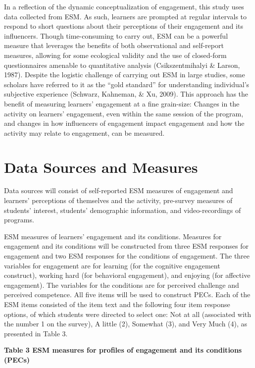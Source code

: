 \documentclass[]{book}
\theoremstyle{definition}
\theoremstyle{definition}
\theoremstyle{definition}
\theoremstyle{remark}
\begin{document}
In a reflection of the dynamic conceptualization of engagement, this
study uses data collected from ESM. As such, learners are prompted at
regular intervals to respond to short questions about their perceptions
of their engagement and its influencers. Though time-consuming to carry
out, ESM can be a powerful measure that leverages the benefits of both
observational and self-report measures, allowing for some ecological
validity and the use of closed-form questionnaires amenable to
quantitative analysis (Csikszentmihalyi \& Larson, 1987). Despite the
logistic challenge of carrying out ESM in large studies, some scholars
have referred to it as the ``gold standard'' for understanding
individual's subjective experience (Schwarz, Kahneman, \& Xu, 2009).
This approach has the benefit of measuring learners' engagement at a
fine grain-size: Changes in the activity on learners' engagement, even
within the same session of the program, and changes in how influencers
of engagement impact engagement and how the activity may relate to
engagement, can be measured.

\section{Data Sources and Measures}\label{data-sources-and-measures}

Data sources will consist of self-reported ESM measures of engagement
and learners' perceptions of themselves and the activity, pre-survey
measures of students' interest, students' demographic information, and
video-recordings of programs.

ESM measures of learners' engagement and its conditions. Measures for
engagement and its conditions will be constructed from three ESM
responses for engagement and two ESM responses for the conditions of
engagement. The three variables for engagement are for learning (for the
cognitive engagement construct), working hard (for behavioral
engagement), and enjoying (for affective engagement). The variables for
the conditions are for perceived challenge and perceived competence. All
five items will be used to construct PECs. Each of the ESM items
consisted of the item text and the following four item response options,
of which students were directed to select one: Not at all (associated
with the number 1 on the survey), A little (2), Somewhat (3), and Very
Much (4), as presented in Table 3.

\textbf{Table 3 ESM measures for profiles of engagement and its
conditions (PECs)}
\end{document}
